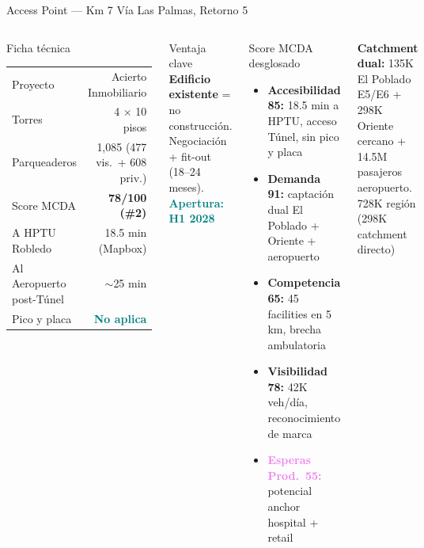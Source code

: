 \documentclass[aspectratio=169, 11pt]{beamer}
\newcommand{\highlight}[1]{\textcolor{teal}{\textbf{#1}}}
\begin{document}
\begin{frame}{Access Point --- Km 7 Vía Las Palmas, Retorno 5}
\begin{columns}[T]
\begin{block}{\small Ficha técnica}
\scriptsize
\begin{tabular}{@{}lr@{}}
\toprule
Proyecto & Acierto Inmobiliario \\
Torres & 4 $\times$ 10 pisos \\
Parqueaderos & 1,085 (477 vis.\ + 608 priv.) \\
Score MCDA & \textcolor{rose}{\textbf{78/100 (\#2)}} \\
A HPTU Robledo & 18.5 min (Mapbox) \\
Al Aeropuerto post-Túnel & $\sim$25 min \\
Pico y placa & \highlight{No aplica} \\
\bottomrule
\end{tabular}
\end{block}

\begin{alertblock}{\small Ventaja clave}
\centering\scriptsize
\textbf{Edificio existente} = no construcción.
Negociación + fit-out (18--24 meses). \highlight{Apertura: H1 2028}
\end{alertblock}

\begin{exampleblock}{\small Score MCDA desglosado}
\scriptsize
\begin{itemize}\setlength{\itemsep}{1pt}
  \item \textbf{Accesibilidad 85:} 18.5 min a HPTU, acceso Túnel, sin pico y placa
  \item \textbf{Demanda 91:} captación dual El Poblado + Oriente + aeropuerto
  \item \textbf{Competencia 65:} 45 facilities en 5 km, brecha ambulatoria
  \item \textcolor{rose}{\textbf{Visibilidad 78:}} 42K veh/día, reconocimiento de marca
  \item \textcolor{violet}{\textbf{Esperas Prod.\ 55:}} potencial anchor hospital + retail
\end{itemize}
\end{exampleblock}

\vspace{1pt}
{\tiny\textbf{Catchment dual:} 135K El Poblado E5/E6 + 298K Oriente cercano + 14.5M pasajeros aeropuerto. 728K región (298K catchment directo)}
\end{columns}
\end{frame}
\end{document}
